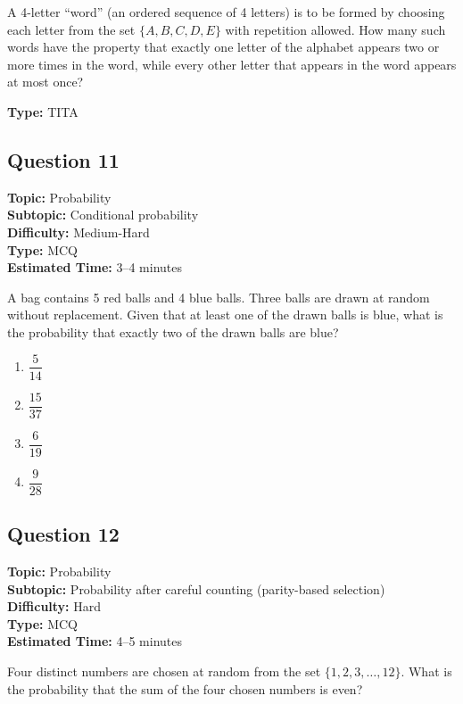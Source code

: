 \documentclass[11pt]{article}
\begin{document}
\begin{tcolorbox}
A 4-letter ``word'' (an ordered sequence of 4 letters) is to be formed by choosing each letter from the set \( \{A, B, C, D, E\} \) with repetition allowed. How many such words have the property that exactly one letter of the alphabet appears two or more times in the word, while every other letter that appears in the word appears at most once?
\end{tcolorbox}

\textbf{Type:} TITA

\subsection*{Question 11}
\textbf{Topic:} Probability \\
\textbf{Subtopic:} Conditional probability \\
\textbf{Difficulty:} Medium-Hard \\
\textbf{Type:} MCQ \\
\textbf{Estimated Time:} 3--4 minutes

\begin{tcolorbox}
A bag contains 5 red balls and 4 blue balls. Three balls are drawn at random without replacement. Given that at least one of the drawn balls is blue, what is the probability that exactly two of the drawn balls are blue?
\end{tcolorbox}

\begin{enumerate}[label=(\Alph*)]
\item \( \dfrac{5}{14} \)
\item \( \dfrac{15}{37} \)
\item \( \dfrac{6}{19} \)
\item \( \dfrac{9}{28} \)
\end{enumerate}

\subsection*{Question 12}
\textbf{Topic:} Probability \\
\textbf{Subtopic:} Probability after careful counting (parity-based selection) \\
\textbf{Difficulty:} Hard \\
\textbf{Type:} MCQ \\
\textbf{Estimated Time:} 4--5 minutes

\begin{tcolorbox}
Four distinct numbers are chosen at random from the set \( \{1, 2, 3, \ldots, 12\} \). What is the probability that the sum of the four chosen numbers is even?
\end{tcolorbox}
\end{document}
